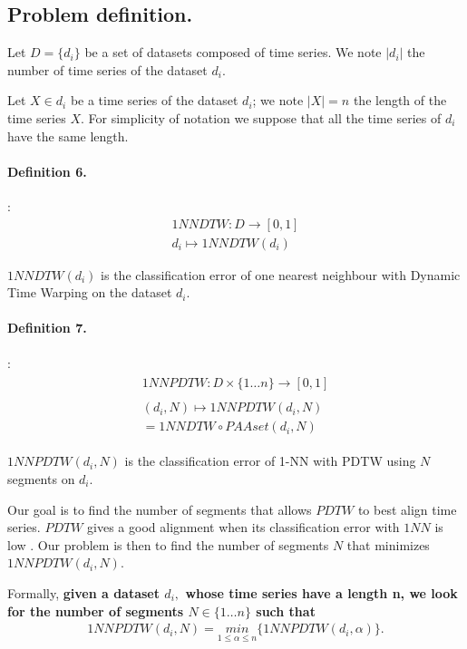 \subsection{Problem definition.}

Let $D = \{d_i\}$ be a set of datasets composed of time series. We note
$|d_i|$ the number of time series of the dataset $d_i$.

Let $X \in d_i$ be a time series of the dataset $d_i$; we note $|X| = n$ the length of the time series $X$. For simplicity of notation we suppose that all the time series of $d_i$ have the same length.

\paragraph{Definition 6.}:
\begin{eqnarray}
 1NNDTW: D \rightarrow [0, 1] \\
  d_i\mapsto 1NNDTW(d_i)
\end{eqnarray}


 $1NNDTW(d_i)$ is the classification error of one nearest neighbour with Dynamic Time Warping on the dataset $d_i$.





\paragraph{Definition 7.}:
\begin{eqnarray}
\begin{array}{l}
 1NNPDTW: D\times\{1 \ldots n\}\rightarrow [0, 1]\\
 \\
(d_i, N)\mapsto 1NNPDTW(d_i, N) \\
 =  1NNDTW \circ PAAset ( d_i, N) 
\end{array}
\end{eqnarray}

$1NNPDTW( d_i, N)$  is the classification error of 1-NN with PDTW using $N$ segments on 
 $d_i$.


Our goal is to find the number of segments that allows $PDTW$ to best align
time series.  $PDTW$ gives a good alignment when its
classification error with $1NN$ is low
\cite{Rakthanmanon_Campana_Mueen_Batista_Westover_Zhu_Zakaria_Keogh_2012}.  Our
problem is then to find the number of segments $N$ that minimizes $1NNPDTW(d_i,
N)$.

Formally, \textbf{ given a dataset $d_i,$ whose time series have a length n, we look for the number
of segments $N \in \{1 \ldots n \}$ such that}
\begin{eqnarray}
1NNPDTW(d_{i},N)=\underset{1\leq\alpha\leq n}{min}\{1NNPDTW(d_i,\alpha)\}.
\end{eqnarray}



